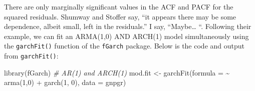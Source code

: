 \documentclass[
]{book}
\newenvironment{Shaded}{\begin{snugshade}}{\end{snugshade}}
\newcommand{\AttributeTok}[1]{\textcolor[rgb]{0.77,0.63,0.00}{#1}}
\newcommand{\CommentTok}[1]{\textcolor[rgb]{0.56,0.35,0.01}{\textit{#1}}}
\newcommand{\DecValTok}[1]{\textcolor[rgb]{0.00,0.00,0.81}{#1}}
\newcommand{\FunctionTok}[1]{\textcolor[rgb]{0.00,0.00,0.00}{#1}}
\newcommand{\NormalTok}[1]{#1}
\newcommand{\OtherTok}[1]{\textcolor[rgb]{0.56,0.35,0.01}{#1}}
\newcommand{\SpecialCharTok}[1]{\textcolor[rgb]{0.00,0.00,0.00}{#1}}
\theoremstyle{definition}
\theoremstyle{definition}
\theoremstyle{definition}
\theoremstyle{definition}
\theoremstyle{remark}
\begin{document}
There are only marginally significant values in the ACF and PACF for the squared residuals. Shumway and Stoffer say, ``it appears there may be some dependence, albeit small, left in the residuals.'' I say, ``Maybe\ldots{} ``. Following their example, we can fit an ARMA(1,0) AND ARCH(1) model simultaneously using the \texttt{garchFit()} function of the \texttt{fGarch} package. Below is the code and output from \texttt{garchFit()}:

\begin{Shaded}
\begin{Highlighting}[]
\FunctionTok{library}\NormalTok{(fGarch)}
\CommentTok{\# AR(1) and ARCH(1)}
\NormalTok{mod.fit }\OtherTok{\textless{}{-}} \FunctionTok{garchFit}\NormalTok{(}\AttributeTok{formula =} \SpecialCharTok{\textasciitilde{}} \FunctionTok{arma}\NormalTok{(}\DecValTok{1}\NormalTok{,}\DecValTok{0}\NormalTok{) }\SpecialCharTok{+} \FunctionTok{garch}\NormalTok{(}\DecValTok{1}\NormalTok{, }\DecValTok{0}\NormalTok{),   }
    \AttributeTok{data =}\NormalTok{ gnpgr)}
\end{Highlighting}
\end{Shaded}
\end{document}
